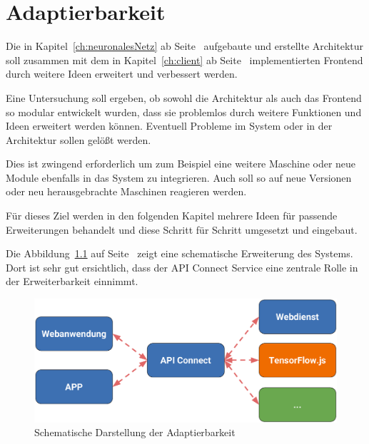 \chapter{Adaptierbarkeit}
\label{ch:adaptierbarkeit}
Die in Kapitel~\ref{ch:neuronalesNetz} ab Seite~\pageref{ch:neuronalesNetz} aufgebaute und erstellte Architektur soll
zusammen mit dem in Kapitel~\ref{ch:client} ab Seite~\pageref{ch:client} implementierten Frontend durch weitere Ideen
erweitert und verbessert werden.

Eine Untersuchung soll ergeben, ob sowohl die Architektur als auch das Frontend so modular entwickelt wurden, dass sie 
problemlos durch weitere Funktionen und Ideen erweitert werden können. Eventuell Probleme im System oder in der
Architektur sollen gelößt werden.

Dies ist zwingend erforderlich um zum Beispiel eine weitere Maschine oder neue Module ebenfalls in das System zu
integrieren. Auch soll so auf neue Versionen oder neu herausgebrachte Maschinen reagieren werden.

Für dieses Ziel werden in den folgenden Kapitel mehrere Ideen für passende Erweiterungen behandelt und diese Schritt für 
Schritt umgesetzt und eingebaut.

Die Abbildung~\ref{fig:schematische_architektur_5} auf Seite~\pageref{fig:schematische_architektur_5} zeigt eine
schematische Erweiterung des Systems. Dort ist sehr gut ersichtlich, dass der API Connect Service eine zentrale Rolle
in der Erweiterbarkeit einnimmt.

\begin{figure}[h]
    \centering
    \includegraphics[width=\textwidth]{images/kapitel_5/architektur_schematisch.pdf}
    \caption{Schematische Darstellung der Adaptierbarkeit}
    \label{fig:schematische_architektur_5}
\end{figure}